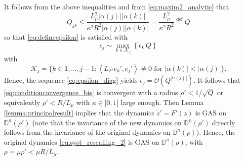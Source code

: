 \documentclass{article}
\begin{document}

It follows from the above inequalities and from \eqref{eq:maxim2_analytic} that
\[  Q_{jk}\leq \dfrac{L_\mu^2\left| \alpha (j)\right| \left| \alpha (k)\right|}{\kappa^2 R^2\left| \alpha (j)\right| \left| \alpha (k)\right|}= \dfrac{ L_\mu^2}{\kappa^2 R^2}\stackrel{\text{def}}{=}Q\]
so that \eqref{eq:defineepsilon} is satisfied with
\begin{equation}
\label{eq:epsilon_diag}
\epsilon_j \sim \max_{k\in \mathcal{K}_j} \left\{\epsilon_k \, Q \right\}
\end{equation}
 with 
$$\mathcal{K}_j=\{k \in{1,\dots,j-1} : \left\langle L_{F'} e_k',  e_j' \right\rangle \neq 0 \textrm{ for }  |\alpha(k)| < |\alpha(j)|\}.$$
Hence, the sequence \eqref{eq:epsilon_diag} yields $\epsilon_j=\mathcal{O}(Q^{|\alpha(j)|})$. It follows that \eqref{eq:conditionconvergence_bis} is convergent with a radius $\rho'<1/\sqrt{Q}$ or equivalently $\rho'<R/L_\mu$ with $\kappa \in ]0,1[$ large enough. Then Lemma \ref{lemma:principalresult} implies that the dynamics $\dot{z}'=F'(z)$  is GAS on $\mathbb{D}^n(\rho')$ (note that the invariance of the new dynamics on $\mathbb{D}^n(\rho')$ directly follows from the invariance of the original dynamics on $\mathbb{D}^n(\rho)$). Hence, the original dynamics \eqref{eq:syst_rescalling_2} is GAS on $\mathbb{D}^n(\rho)$, with $\rho=\mu \rho' <\mu R/L_\mu$.


\end{document}
